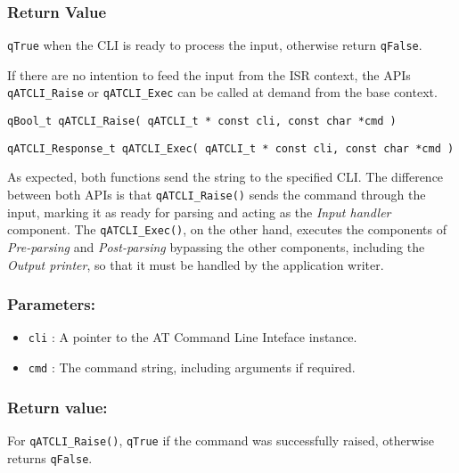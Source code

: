 \subsubsection*{Return Value}
\lstinline{qTrue} when the CLI is ready to process the input, otherwise return \lstinline{qFalse}.

\noindent\hrulefill
\newline
If there are no intention to feed the input from the ISR context, the APIs \lstinline{qATCLI_Raise}  or \lstinline{qATCLI_Exec}  can be called at demand from the base context.
\medskip

\begin{lstlisting}[style=CStyle]
qBool_t qATCLI_Raise( qATCLI_t * const cli, const char *cmd )
\end{lstlisting}

\begin{lstlisting}[style=CStyle]
qATCLI_Response_t qATCLI_Exec( qATCLI_t * const cli, const char *cmd )
\end{lstlisting}

As expected, both functions send the string to the specified CLI.
The difference between both APIs is that \lstinline{qATCLI_Raise()} sends the command through the input, marking it as ready for parsing and acting as the \textit{Input handler} component.
The \lstinline{qATCLI_Exec()}, on the other hand, executes the components of \textit{Pre-parsing} and \textit{Post-parsing} bypassing the other components, including the \textit{Output printer}, so that it must be handled by the application writer.

\subsubsection*{Parameters:}
\begin{itemize}
    \item \lstinline{cli} : A pointer to the AT Command Line Inteface instance.
    \item \lstinline{cmd} : The command string, including arguments if required.
\end{itemize}

\subsubsection*{Return value:}
For \lstinline{qATCLI_Raise()}, \lstinline{qTrue} if the command was successfully raised, otherwise returns \lstinline{qFalse}.

